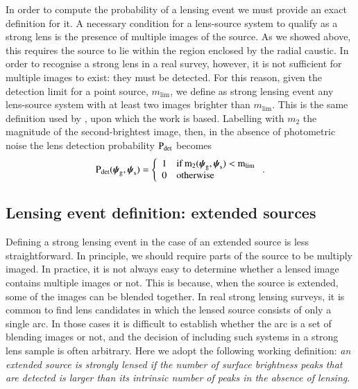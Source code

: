 \documentclass{aa}
\def\psilens{\boldsymbol{\psi}_\mathrm{g}}
\def\psisource{\boldsymbol{\psi}_\mathrm{s}}
\def\pdet{{\rm P}_\mathrm{det}}
\begin{document}
In order to compute the probability of a lensing event we must provide an exact definition for it.
A necessary condition for a lens-source system to qualify as a strong lens is the presence of multiple images of the source.
As we showed above, this requires the source to lie within the region enclosed by the radial caustic.
In order to recognise a strong lens in a real survey, however, it is not sufficient for multiple images to exist: they must be detected.
For this reason, given the detection limit for a point source, $m_{\mathrm{lim}}$, we define as strong lensing event any lens-source system with at least two images brighter than $m_{\mathrm{lim}}$.
This is the same definition used by \citep{VMK09}, upon which the \citet{MVK09} work is based.
Labelling with $m_2$ the magnitude of the second-brightest image, then, in the absence of photometric noise the lens detection probability $\pdet$ becomes
\begin{equation}\label{eq:pointdet}
\pdet(\psilens,\psisource) = \left\{\begin{array}{ll} 1 & \rm{if}\,m_2(\psilens,\psisource) < m_{\mathrm{lim}} \\
0 & \rm{otherwise}\end{array}\right. .
\end{equation}

\subsection{Lensing event definition: extended sources}\label{ssec:lensdefext}

Defining a strong lensing event in the case of an extended source is less straightforward.
In principle, we should require parts of the source to be multiply imaged.
In practice, it is not always easy to determine whether a lensed image contains multiple images or not.
This is because, when the source is extended, some of the images can be blended together.
In real strong lensing surveys, it is common to find lens candidates in which the lensed source consists of only a single arc. In those cases it is difficult to establish whether the arc is a set of blending images or not, and the decision of including such systems in a strong lens sample is often arbitrary.
Here we adopt the following working definition: {\em an extended source is strongly lensed if the number of surface brightness peaks that are detected is larger than its intrinsic number of peaks in the absence of lensing}.
\end{document}
